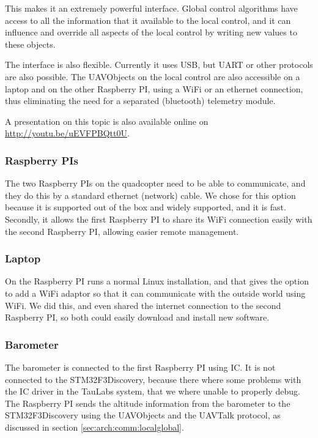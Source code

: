 \documentclass[11pt, a4paper, onecolumn, oneside, parskip=half]{scrartcl}
\begin{document}
This makes it an extremely powerful interface. Global control algorithms have access to all the information that it available to the local control, and it can influence and override all aspects of the local control by writing new values to these objects.

The interface is also flexible. Currently it uses USB, but UART or other protocols are also possible. The UAVObjects on the local control are also accessible on a laptop and on the other Raspberry PI, using a WiFi or an ethernet connection, thus eliminating the need for a separated (bluetooth) telemetry module.

A presentation on this topic is also available online on \url{http://youtu.be/uEVFPBQtt0U}.

\subsubsection{Raspberry PIs}
\label{sec:arch:comm:raspi}
The two Raspberry PIs on the quadcopter need to be able to communicate, and they do this by a standard ethernet (network) cable. We chose for this option because it is supported out of the box and widely supported, and it is fast. Secondly, it allows the first Raspberry PI to share its WiFi connection easily with the second Raspberry PI, allowing easier remote management.

\subsubsection{Laptop}
\label{sec:arch:comm:laptop}
On the Raspberry PI runs a normal Linux installation, and that gives the option to add a WiFi adaptor so that it can communicate with the outside world using WiFi. We did this, and even shared the internet connection to the second Raspberry PI, so both could easily download and install new software.

\subsubsection{Barometer}
\label{sec:arch:comm:barometer}
The barometer is connected to the first Raspberry PI using I\texttwosuperior C. It is not connected to the STM32F3Discovery, because there where some problems with the I\texttwosuperior C driver in the TauLabs system, that we where unable to properly debug. The Raspberry PI sends the altitude information from the barometer to the STM32F3Discovery using the UAVObjects and the UAVTalk protocol, as discussed in section \ref{sec:arch:comm:localglobal}.
\end{document}
